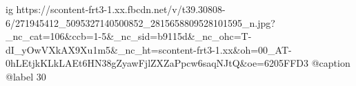  
 
 
 
 

\ifcmt
  ig https://scontent-frt3-1.xx.fbcdn.net/v/t39.30808-6/271945412_5095327140500852_2815658809528101595_n.jpg?_nc_cat=106&ccb=1-5&_nc_sid=b9115d&_nc_ohc=T-dI_yOwVXkAX9Xu1m5&_nc_ht=scontent-frt3-1.xx&oh=00_AT-0hLEtjkKLkLAEt6HN38gZyawFjlZXZaPpcw6saqNJtQ&oe=6205FFD3
  @caption @label 30
\fi
